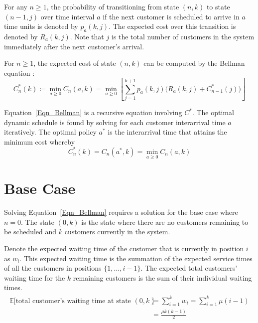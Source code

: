 For any $n \geq 1$, the probability of transitioning from state $(n, k)$ to state $(n - 1, j)$ over time interval $a$ if the next customer is scheduled to arrive in $a$ time units is denoted by $p_{a} (k, j)$. The expected cost over this transition is denoted by $R_{a} (k, j)$. Note that $j$ is the total number of customers in the system immediately after the next customer's arrival.

For $n \geq 1$, the expected cost of state $(n, k)$ can be computed by the Bellman equation \citep{Bellman}:
\begin{equation}
	C_{n}^{*} (k) \coloneqq \min_{a \geq 0} C_{n} (a, k) = \min_{a \geq 0} \left[ \sum_{j = 1}^{k + 1} p_{a} (k, j) \Big( R_{a} (k, j) + C_{n - 1}^{*} (j) \Big) \right]
	\label{Eqn_Bellman}
\end{equation}

Equation~\ref{Eqn_Bellman} is a recursive equation involving $C^{*}$. The optimal dynamic schedule is found by solving for each customer interarrival time $a$ iteratively. The optimal policy $a^{*}$ is the interarrival time that attains the minimum cost whereby
\begin{equation}
	C_{n}^{*} (k) = C_{n} (a^{*}, k) = \min_{a \geq 0} C_{n} (a, k)
\end{equation}

\section{Base Case}
Solving Equation~\ref{Eqn_Bellman} requires a solution for the base case where $n = 0$. The state $(0, k)$ is the state where there are no customers remaining to be scheduled and $k$ customers currently in the system.

Denote the expected waiting time of the customer that is currently in position $i$ as $w_{i}$. This expected waiting time is the summation of the expected service times of all the customers in positions $\{ 1, \ldots, i - 1 \}$. The expected total customers' waiting time for the $k$ remaining customers is the sum of their individual waiting times.
\begin{align}
	\begin{split}
		\mathbb{E} \Big[\text{total customer's waiting time at state $(0, k)$} \Big] & = \sum_{i = 1}^{k} w_{i} = \sum_{i = 1}^{k} \mu (i - 1) \\
		& = \frac{\mu k (k - 1)}{2}
	\end{split}
\end{align}

